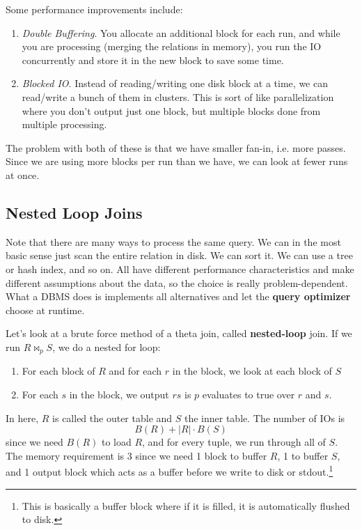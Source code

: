 \documentclass{article}
\begin{document}
    Some performance improvements include: 
    \begin{enumerate}
      \item \textit{Double Buffering}. You allocate an additional block for each run, and while you are processing (merging the relations in memory), you run the IO concurrently and store it in the new block to save some time. 
      \item \textit{Blocked IO}. Instead of reading/writing one disk block at a time, we can read/write a bunch of them in clusters. This is sort of like parallelization where you don't output just one block, but multiple blocks done from multiple processing. 
    \end{enumerate}
    The problem with both of these is that we have smaller fan-in, i.e. more passes. Since we are using more blocks per run than we have, we can look at fewer runs at once. 

  \subsection{Nested Loop Joins} 

    Note that there are many ways to process the same query. We can in the most basic sense just scan the entire relation in disk. We can sort it. We can use a tree or hash index, and so on. All have different performance characteristics and make different assumptions about the data, so the choice is really problem-dependent. What a DBMS does is implements all alternatives and let the \textbf{query optimizer} choose at runtime. 

    \begin{definition}
      Let's look at a brute force method of a theta join, called \textbf{nested-loop} join. If we run $R \bowtie_p S$, we do a nested for loop: 
      \begin{enumerate}
        \item For each block of $R$ and for each $r$ in the block, we look at each block of $S$ 
        \item For each $s$ in the block, we output $rs$ is $p$ evaluates to true over $r$ and $s$.  
      \end{enumerate}
      In here, $R$ is called the outer table and $S$ the inner table. The number of IOs is 
      \begin{equation}
        B(R) + |R| \cdot B(S)
      \end{equation}
      since we need $B(R)$ to load $R$, and for every tuple, we run through all of $S$. The memory requirement is $3$ since we need 1 block to buffer $R$, 1 to buffer $S$, and 1 output block which acts as a buffer before we write to disk or stdout.\footnote{This is basically a buffer block where if it is filled, it is automatically flushed to disk.}
    \end{definition} 
\end{document}
